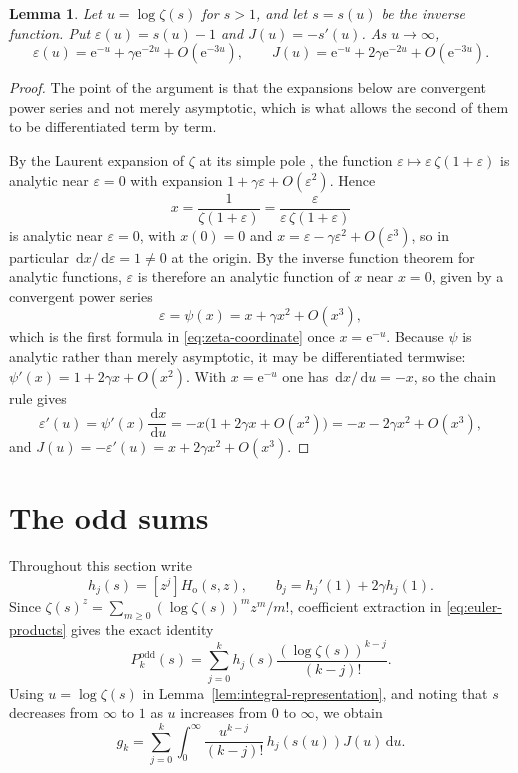 \documentclass[11pt]{amsart}
\theoremstyle{plain}
\newtheorem{lemma}[theorem]{Lemma}
\theoremstyle{definition}
\newcommand{\e}{\mathrm e}
\newcommand{\dd}{\,\mathrm d}
\begin{document}
\begin{lemma}\label{lem:zeta-coordinate}
Let $u=\log\zeta(s)$ for $s>1$, and let $s=s(u)$ be the inverse function. Put
$\varepsilon(u)=s(u)-1$ and $J(u)=-s'(u)$. As $u\to\infty$,
\begin{equation}\label{eq:zeta-coordinate}
  \varepsilon(u)=\e^{-u}+\gamma\e^{-2u}+O(\e^{-3u}),
  \qquad
  J(u)=\e^{-u}+2\gamma\e^{-2u}+O(\e^{-3u}).
\end{equation}
\end{lemma}

\begin{proof}
The point of the argument is that the expansions below are convergent power
series and not merely asymptotic, which is what allows the second of them to be
differentiated term by term.

By the Laurent expansion of $\zeta$ at its simple pole
\cite[Ch.~1]{MV}, the function $\varepsilon\mapsto\varepsilon\,
\zeta(1+\varepsilon)$ is analytic near $\varepsilon=0$ with expansion
$1+\gamma\varepsilon+O(\varepsilon^2)$. Hence
\[
 x=\frac1{\zeta(1+\varepsilon)}
  =\frac{\varepsilon}{\varepsilon\,\zeta(1+\varepsilon)}
\]
is analytic near $\varepsilon=0$, with $x(0)=0$ and
$x=\varepsilon-\gamma\varepsilon^2+O(\varepsilon^3)$, so in particular
$\dd x/\dd\varepsilon=1\neq0$ at the origin. By the inverse function theorem
for analytic functions, $\varepsilon$ is therefore an analytic function of $x$
near $x=0$, given by a convergent power series
\[
 \varepsilon=\psi(x)=x+\gamma x^2+O(x^3),
\]
which is the first formula in \eqref{eq:zeta-coordinate} once
$x=\e^{-u}$. Because $\psi$ is analytic rather than merely asymptotic, it may
be differentiated termwise: $\psi'(x)=1+2\gamma x+O(x^2)$. With
$x=\e^{-u}$ one has $\dd x/\dd u=-x$, so the chain rule gives
\[
  \varepsilon'(u)=\psi'(x)\frac{\dd x}{\dd u}=-x\bigl(1+2\gamma x+O(x^2)\bigr)
  =-x-2\gamma x^2+O(x^3),
\]
and $J(u)=-\varepsilon'(u)=x+2\gamma x^2+O(x^3)$.
\end{proof}

\section{The odd sums}\label{sec:odd}

Throughout this section write
\[
  h_j(s)=[z^j]H_{\mathrm o}(s,z),
  \qquad
  b_j=h_j'(1)+2\gamma h_j(1).
\]
Since
$\zeta(s)^z=\sum_{m\geq0}(\log\zeta(s))^m z^m/m!$, coefficient extraction in
\eqref{eq:euler-products} gives the exact identity
\begin{equation}\label{eq:odd-coefficient-extraction}
  P_k^{\mathrm{odd}}(s)
  =\sum_{j=0}^k h_j(s)\frac{(\log\zeta(s))^{k-j}}{(k-j)!}.
\end{equation}
Using $u=\log\zeta(s)$ in Lemma~\ref{lem:integral-representation}, and noting
that $s$ decreases from $\infty$ to $1$ as $u$ increases from $0$ to
$\infty$, we obtain
\begin{equation}\label{eq:odd-u-integral}
  g_k
  =\sum_{j=0}^k\int_0^\infty
       \frac{u^{k-j}}{(k-j)!}\,h_j(s(u))J(u)\dd u.
\end{equation}
\end{document}
